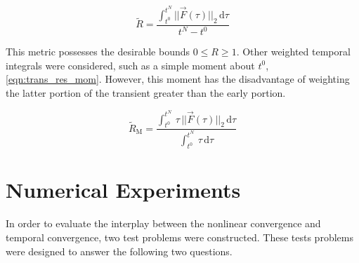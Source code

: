 \begin{equation}
\label{eqn:trans_res_ave}
\tilde{R} = \frac{\int_{t^{0}}^{t^{N}} ||\vec{F}(\tau)||_2 \,\mathrm{d} \tau}{t^{N} - t^{0}}
\end{equation}

This metric possesses the desirable bounds $0 \leq R \geq 1$.
Other weighted temporal integrals were considered, such as a simple moment about $t^{0}$, \eqref{eqn:trans_res_mom}.
However, this moment has the disadvantage of weighting the latter portion of the transient greater than the early portion.

\begin{equation}
\label{eqn:trans_res_mom}
\tilde{R}_{\text{M}} = \frac{\int_{t^{0}}^{t^{N}} \,\tau\,||\vec{F}(\tau)||_2 \,\mathrm{d} \tau}{\int_{t^{0}}^{t^{N}} \,\tau \,\mathrm{d} \tau}
\end{equation}

\section{Numerical Experiments}
\label{sect:numerical_experiments}

In order to evaluate the interplay between the nonlinear convergence and temporal convergence, two test problems were constructed.
These tests problems were designed to answer the following two questions.

